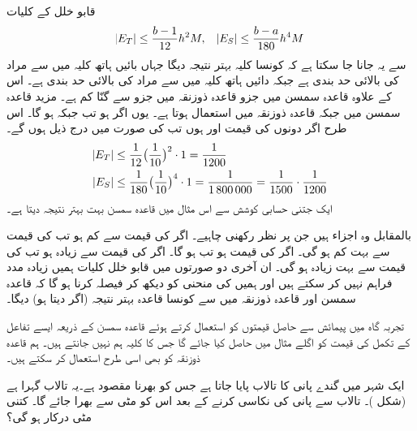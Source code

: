 قابو خلل کے کلیات 
\begin{align*}
\abs{E_T}\le \frac{b-1}{12}h^2M,\quad \abs{E_S}\le \frac{b-a}{180}h^4M
\end{align*}
سے یہ جانا جا سکتا ہے کہ کونسا کلیہ بہتر نتیجہ دیگا جہاں بائیں ہاتھ کلیہ میں سے مراد  کی بالائی حد بندی ہے جبکہ دائیں ہاتھ کلیہ میں  سے مراد  کی بالائی حد بندی ہے۔ اس کے علاوہ قاعدہ سمسن میں جزو   قاعدہ ذوزنقہ میں جزو  سے  گنّا کم ہے۔ مزید قاعدہ سمسن میں  جبکہ قاعدہ ذوزنقہ میں  استعمال ہوتا ہے۔ یوں اگر  ہو تب  جبکہ  ہو گا۔ اس طرح اگر دونوں  کی قیمت  اور   ہوں تب  کی صورت میں  درج ذیل ہوں گے۔
\begin{align*}
\abs{E_T}&\le \frac{1}{12}\big(\frac{1}{10}\big)^2\cdot 1=\frac{1}{1200}\\
\abs{E_S}&\le \frac{1}{180}\big(\frac{1}{10}\big)^4\cdot 1=\frac{1}{\num{1800000}}=\frac{1}{1500}\cdot \frac{1}{1200}
\end{align*}
ایک جتنی حسابی کوشش سے اس مثال میں  قاعدہ سمسن بہت بہتر نتیجہ دیتا ہے۔

 بالمقابل  وہ اجزاء ہیں جن پر نظر رکھنی چاہیے۔ اگر  کی قیمت  سے کم ہو تب  کی قیمت  سے بہت کم ہو گی۔ اگر  کی قیمت  ہو تب  ہو گا۔ اگر  کی قیمت  سے زیادہ ہو تب  کی قیمت  سے بہت زیادہ ہو گی۔ ان آخری دو صورتوں میں قابو خلل کلیات  ہمیں زیادہ مدد فراہم نہیں کر سکتے ہیں اور ہمیں  کی منحنی کو دیکھ کر فیصلہ کرنا ہو گا کہ  قاعدہ سمسن اور قاعدہ ذوزنقہ میں سے کونسا قاعدہ بہتر نتیجہ (اگر دیتا ہو) دیگا۔

تجربہ گاہ میں پیمائش سے حاصل قیمتوں کو استعمال کرتے ہوئے قاعدہ سمسن کے ذریعہ ایسے تفاعل کے تکمل کی قیمت کو اگلے مثال میں حاصل کیا جائے گا جس کا کلیہ ہم  نہیں جانتے ہیں۔ ہم قاعدہ ذوزنقہ کو بھی اسی طرح  استعمال کر سکتے ہیں۔

ایک شہر میں گندے پانی کا تالاب پایا جاتا ہے جس کو بھرنا مقصود ہے۔یہ تالاب  گہرا ہے (شکل )۔ تالاب سے پانی کی نکاسی کرنے کے بعد اس کو مٹی سے بھرا جائے گا۔ کتنی مٹی درکار ہو گی؟ 

